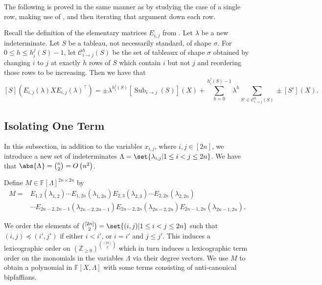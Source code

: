 \documentclass[10pt,a4paper]{amsart}
\newcommand*\cf{c.f.}
\DeclareMathOperator{\Sub}{Sub}
\newcommand*\Z{\mathbb{Z}}
\newcommand*\F{\mathbb{F}}
\newcommand*\bigO[1]{%
    O\kern-0.0pt\left(#1\right)
}
\begin{document}
The following is proved in the same manner as  by studying the case of a single row, making use of , and then iterating that argument down each row.
\begin{lem}[{\cf~\cite[proof of Lemma 4.1]{AF21}}]\label{lem:Eij_conj}
    Recall the definition of the elementary matrices $E_{i, j}$ from .
    Let $\lambda$ be a new indeterminate.
    Let $S$ be a tableau, not necessarily standard, of shape $\sigma$.
    For $0 \leq h \leq h_{i}^{j}(S) - 1$, let $\mathcal{C}^{h}_{i \to j}(S)$ be the set of tableaux of shape $\sigma$ obtained by changing $i$ to $j$ at exactly $h$ rows of $S$ which contain $i$ but not $j$ and reordering those rows to be increasing.
    Then we have that
    \begin{equation}\label{eq:Eij_conj}
        [S](E_{i, j}(\lambda) X E_{i, j}(\lambda)^\top) = \pm \lambda^{h_{i}^{j}(S)} [\Sub_{i \to j}(S)](X) + \sum_{h = 0}^{h_{i}^{j}(S) - 1} \lambda^h \sum_{S' \in \mathcal{C}^{h}_{i \to j}(S)} \pm  [S'](X).
    \end{equation}
\end{lem}

\subsection{Isolating One Term}\label{sec:extract_pfaff_NEW}

In this subsection, in addition to the variables $x_{i,j}$, where $i, j \in [2n]$, we introduce a new set of indeterminates $\Lambda = \set{\lambda_{i, j} | 1 \leq i < j \leq 2n}$.
We have that $\abs{\Lambda} = \binom{n}{2} = \bigO{n^2}$.

Define $M \in \F[\Lambda]^{2n \times 2n}$ by
\begin{align*}
M ={}& E_{1, 2}(\lambda_{1, 2}) \cdots E_{1, 2n}(\lambda_{1, 2n}) E_{2, 3}(\lambda_{2, 3}) \cdots E_{2, 2n}(\lambda_{2, 2n}) \\ 
&\cdots E_{2n - 2, 2n - 1}(\lambda_{2n - 2, 2n - 1}) E_{2n - 2, 2n}(\lambda_{2n - 2, 2n}) E_{2n - 1, 2n}(\lambda_{2n - 1, 2n}).
\end{align*}

We order the elements of $\binom{[2n]}{2} = \set{(i, j) | 1 \leq i < j \leq 2n}$ such that $(i,j) \preceq (i',j')$ if either $i < i'$, or $i = i'$ and $j \leq j'$.
This induces a lexicographic order on $(\Z_{\geq 0})^{\binom{[2n]}{2}}$ which in turn induces a lexicographic term order on the monomials in the variables $\Lambda$ via their degree vectors.
We use $M$ to obtain a polynomial in $\F[X, \Lambda]$ with some terms consisting of anti-canonical bipfaffians.
\end{document}
